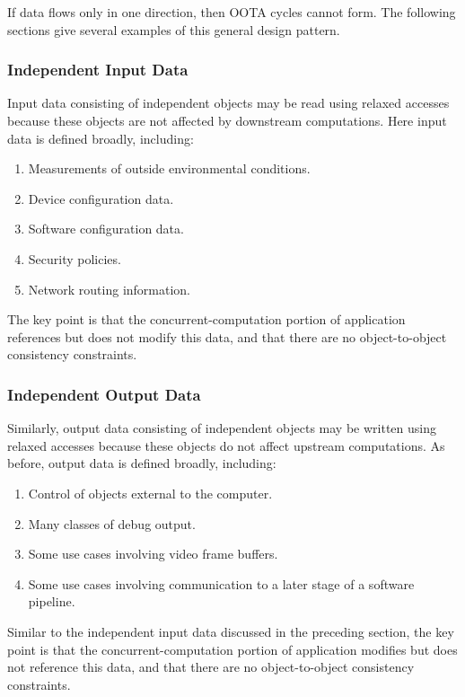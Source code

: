 \documentclass[10]{article}
\begin{document}
If data flows only in one direction, then OOTA cycles cannot form.
The following sections give several examples of this general design
pattern.

\subsubsection{Independent Input Data}
\label{sec:Independent Input Data}

Input data consisting of independent objects may be read using relaxed
accesses because these objects are not affected by downstream computations.
Here input data is defined broadly, including:

\begin{enumerate}
\item	Measurements of outside environmental conditions.
\item	Device configuration data.
\item	Software configuration data.
\item	Security policies.
\item	Network routing information.
\end{enumerate}

The key point is that the concurrent-computation portion of application
references but does not modify this data, and that there are no
object-to-object consistency constraints.

\subsubsection{Independent Output Data}
\label{sec:Independent Output Data}

Similarly, output data consisting of independent objects may be written
using relaxed accesses because these objects do not affect upstream
computations.
As before, output data is defined broadly, including:

\begin{enumerate}
\item	Control of objects external to the computer.
\item	Many classes of debug output.
\item	Some use cases involving video frame buffers.
\item	Some use cases involving communication to a later stage of a
	software pipeline.
\end{enumerate}

Similar to the independent input data discussed in the preceding section,
the key point is that the concurrent-computation portion of application
modifies but does not reference this data, and that there are no
object-to-object consistency constraints.
\end{document}
